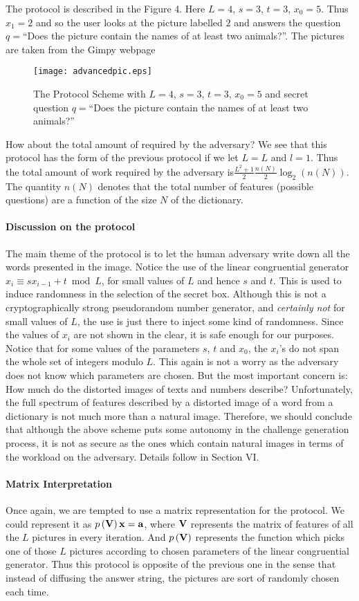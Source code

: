 \documentclass{llncs}
\begin{document}
The protocol is described in the Figure 4. Here $L=4$, $s=3$, $t=3$, $x_0=5$. Thus $x_1=2$ and so the user looks at the picture labelled $2$ and answers the question $q=$``Does the picture contain the names of at least two animals?''. The pictures are taken from the Gimpy webpage \cite{gimpy}
\begin{figure}[ht]
\centerline{\texttt{[image: advancedpic.eps]}}
\caption{The Protocol Scheme with $L=4$, $s=3$, $t=3$, $x_0=5$ and secret question $q=$``Does the picture contain the names of at least two animals?''}
\label{fig7}
\end{figure}
How about the total amount of required by the adversary? We see that this protocol has the form of the previous protocol if we let $L=L$ and $l=1$. Thus the total amount of work required by the adversary is$\frac{{L^2  + 1}}{2}\frac{{n\left( N \right)}}{2}\log _2 \left( {n\left( N \right)} \right)$. The quantity $n\left( N \right)$ denotes that the total number of features (possible questions) are a function of the size $N$ of the dictionary. 
\paragraph*{Discussion on the protocol} The main theme of the protocol is to let the human adversary write down all the words presented in the image. Notice the use of the linear congruential generator $x_i  \equiv sx_{i - 1}  + t\bmod L$, for small values of $L$ and hence $s$ and $t$. This is used to induce randomness in the selection of the secret box. Although this is not a cryptographically strong pseudorandom number generator, and \textit{certainly not} for small values of $L$, the use is just there to inject some kind of randomness. Since the values of $x_i$ are not shown in the clear, it is safe enough for our purposes. Notice that for some values of the parameters $s$, $t$ and $x_0$, the $x_i$'s do not span the whole set of integers modulo $L$. This again is not a worry as the adversary does not know which parameters are chosen. But the most important concern is: How much do the distorted images of texts and numbers describe? Unfortunately, the full spectrum of features described by a distorted image of a word from a dictionary is not much more than a natural image. Therefore, we should conclude that although the above scheme puts some autonomy in the challenge generation process, it is not as secure as the ones which contain natural images in terms of the workload on the adversary. Details follow in Section VI.
\paragraph*{Matrix Interpretation} Once again, we are tempted to use a matrix representation for the protocol. We could represent it as $p\left( {\bf{V}} \right){\bf{x}} = {\bf{a}}$, where ${\bf{V}}$ represents the matrix of features of all the $L$ pictures in every iteration. And $p\left( {\bf{V}} \right)$ represents the function which picks one of those $L$ pictures according to chosen parameters of the linear congruential generator. Thus this protocol is opposite of the previous one in the sense that instead of diffusing the answer string, the pictures are sort of randomly chosen each time.  
\end{document}
